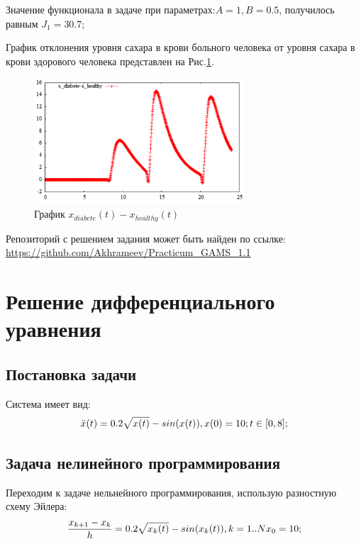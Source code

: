\documentclass[14pt]{article}
\begin{document}
Значение функционала в  задаче при параметрах:$A=1, B=0.5$, получилось равным $J_1 = 30.7$;

График отклонения уровня сахара в крови больного человека от уровня сахара в крови здорового человека представлен на Рис.\ref{task1_dx}.

\begin{figure}[t!]
\centering
\includegraphics[width=0.7\textwidth]{x_diabete-x_healthy}
\caption{График $x_{diabete}(t)-x_{healthy}(t)$}
\label{task1_dx}
\end{figure}

Репозиторий с решением задания может быть найден по ссылке:
\url{https://github.com/Akhrameev/Practicum_GAMS_1.1}

\clearpage 

\newpage

\section{Решение дифференциального уравнения}

\subsection{Постановка задачи}
Система имеет вид:
\begin{equation}\label{syst2_oo}
\ddot{x}(t)=0.2\sqrt{x(t)}-sin(x(t)),\\
x(0)=10; t\in[0,8];
\end{equation}

\subsection{Задача нелинейного программирования}
Переходим к задаче нельнейного программирования, использую разностную схему Эйлера:
\begin{equation}
\frac{x_{k+1}-x_k}{h}=0.2\sqrt{x_k(t)}-sin(x_k(t)), k=1..N\\
x_0=10;
\end{equation}
\end{document}
